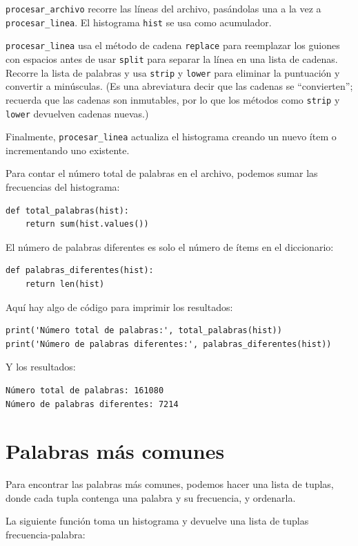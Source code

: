 \documentclass[10pt]{book}
\begin{document}
\verb"procesar_archivo" recorre las líneas del archivo,
pasándolas una a la vez a \verb"procesar_linea".  El histograma
{\tt hist} se usa como acumulador.

\verb"procesar_linea" usa el método de cadena {\tt replace} para reemplazar
los guiones con espacios antes de usar {\tt split} para separar la línea en una
lista de cadenas.  Recorre la lista de palabras y usa {\tt strip}
y {\tt lower} para eliminar la puntuación y convertir a minúsculas.  (Es
una abreviatura decir que las cadenas se ``convierten''; recuerda que
las cadenas son inmutables, por lo que los métodos como {\tt strip} y {\tt lower}
devuelven cadenas nuevas.)

Finalmente, \verb"procesar_linea" actualiza el histograma creando un nuevo
ítem o incrementando uno existente.

Para contar el número total de palabras en el archivo, podemos sumar
las frecuencias del histograma:

\begin{verbatim}
def total_palabras(hist):
    return sum(hist.values())
\end{verbatim}
%
El número de palabras diferentes es solo el número de ítems en
el diccionario:

\begin{verbatim}
def palabras_diferentes(hist):
    return len(hist)
\end{verbatim}
%
Aquí hay algo de código para imprimir los resultados:

\begin{verbatim}
print('Número total de palabras:', total_palabras(hist))
print('Número de palabras diferentes:', palabras_diferentes(hist))
\end{verbatim}
%
Y los resultados:

\begin{verbatim}
Número total de palabras: 161080
Número de palabras diferentes: 7214
\end{verbatim}
%

\section{Palabras más comunes}

Para encontrar las palabras más comunes, podemos hacer una lista de tuplas,
donde cada tupla contenga una palabra y su frecuencia,
y ordenarla.

La siguiente función toma un histograma y devuelve una lista de
tuplas frecuencia-palabra:
\end{document}
